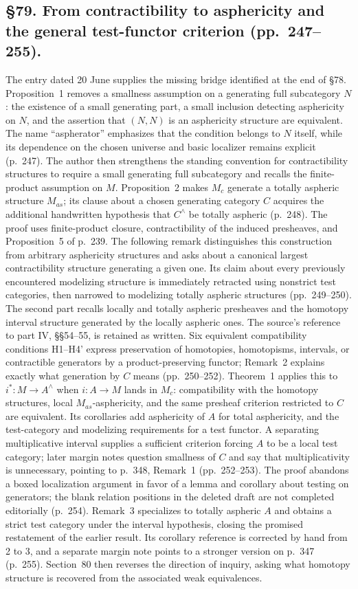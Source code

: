 \documentclass[10pt,oneside]{book}
\begin{document}
\subsection*{\S79. From contractibility to asphericity and the general test-functor criterion (pp.\ 247--255).}
The entry dated 20 June supplies the missing bridge identified at the end of \S78. Proposition~1 removes a smallness assumption on a generating full subcategory $N$: the existence of a small generating part, a small inclusion detecting asphericity on $N$, and the assertion that $(N,N)$ is an asphericity structure are equivalent. The name “aspherator” emphasizes that the condition belongs to $N$ itself, while its dependence on the chosen universe and basic localizer remains explicit (p.\ 247). The author then strengthens the standing convention for contractibility structures to require a small generating full subcategory and recalls the finite-product assumption on $M$. Proposition~2 makes $M_c$ generate a totally aspheric structure $M_{as}$; its clause about a chosen generating category $C$ acquires the additional handwritten hypothesis that $C^\wedge$ be totally aspheric (p.\ 248). The proof uses finite-product closure, contractibility of the induced presheaves, and Proposition~5 of p.\ 239. The following remark distinguishes this construction from arbitrary asphericity structures and asks about a canonical largest contractibility structure generating a given one. Its claim about every previously encountered modelizing structure is immediately retracted using nonstrict test categories, then narrowed to modelizing totally aspheric structures (pp.\ 249--250). The second part recalls locally and totally aspheric presheaves and the homotopy interval structure generated by the locally aspheric ones. The source's reference to part IV, \S\S54--55, is retained as written. Six equivalent compatibility conditions H1--H4' express preservation of homotopies, homotopisms, intervals, or contractible generators by a product-preserving functor; Remark~2 explains exactly what generation by $C$ means (pp.\ 250--252). Theorem~1 applies this to $i^*:M\to A^\wedge$ when $i:A\to M$ lands in $M_c$: compatibility with the homotopy structures, local $M_{as}$-asphericity, and the same presheaf criterion restricted to $C$ are equivalent. Its corollaries add asphericity of $A$ for total asphericity, and the test-category and modelizing requirements for a test functor. A separating multiplicative interval supplies a sufficient criterion forcing $A$ to be a local test category; later margin notes question smallness of $C$ and say that multiplicativity is unnecessary, pointing to p.\ 348, Remark~1 (pp.\ 252--253). The proof abandons a boxed localization argument in favor of a lemma and corollary about testing on generators; the blank relation positions in the deleted draft are not completed editorially (p.\ 254). Remark~3 specializes to totally aspheric $A$ and obtains a strict test category under the interval hypothesis, closing the promised restatement of the earlier result. Its corollary reference is corrected by hand from 2 to 3, and a separate margin note points to a stronger version on p.\ 347 (p.\ 255). Section~80 then reverses the direction of inquiry, asking what homotopy structure is recovered from the associated weak equivalences.
\end{document}
